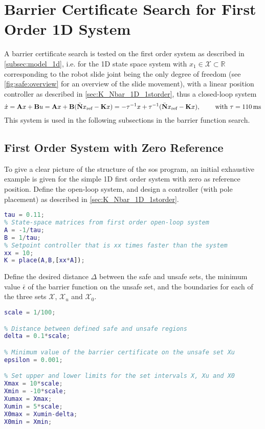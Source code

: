 
\section{Barrier Certificate Search for First Order 1D System}
A barrier certificate search is tested on the first order system as described in \autoref{subsec:model_1d}, i.e. for the  1D state space system with $x_1\in\mathcal{X}\subset\mathbb{R}$ corresponding to the robot slide joint being the only degree of freedom (see \autoref{fig:safe:overview} for an overview of the slide movement), with a linear position controller as described in \autoref{sec:K_Nbar_1D_1storder}, thus a closed-loop system
\begin{equation}
\dot{x} = \textbf{A}x+\textbf{B}u = \textbf{A}x+\textbf{B}(\bar{\mathbf{N}}x_\text{ref}-\textbf{K}x) = %
-\tau^{-1}x+\tau^{-1}(\bar{\mathbf{N}}x_\text{ref}-\textbf{K}x), \kk \text{with }\tau=110\,\text{ms}\label{eq:sos_firstorder}
\end{equation}
This system is used in the following subsections in the barrier function search.

\subsection{First Order System with Zero Reference}
To give a clear picture of the structure of the \gls{sos} program, an initial exhaustive example is given for the simple 1D first order system with zero as reference position.
Define the open-loop system, and design a controller (with pole placement) as described in \autoref{sec:K_Nbar_1D_1storder}.
\begin{lstlisting}[language=matlab]
% Time constant from measurement
tau = 0.11;
% State-space matrices from first order open-loop system
A = -1/tau;
B = 1/tau;
% Setpoint controller that is xx times faster than the system
xx = 10;
K = place(A,B,[xx*A]);
\end{lstlisting}
Define the desired distance $\Delta$ between the safe and unsafe sets,  the minimum value $\bar{\epsilon}$ of the barrier function on the unsafe set, and the boundaries for each of the three sets $\mathcal{X}$, $\mathcal{X}_u$ and $\mathcal{X}_0$. %
\begin{lstlisting}[language=matlab]
% scaling factor = 1/100 for [meter], or 1 for [cm]
scale = 1/100;

% Distance between defined safe and unsafe regions
delta = 0.1*scale;

% Minimum value of the barrier certificate on the unsafe set Xu
epsilon = 0.001;

% Set upper and lower limits for the set intervals X, Xu and X0
Xmax = 10*scale;
Xmin = -10*scale;
Xumax = Xmax;
Xumin = 5*scale;
X0max = Xumin-delta;
X0min = Xmin;
\end{lstlisting}


